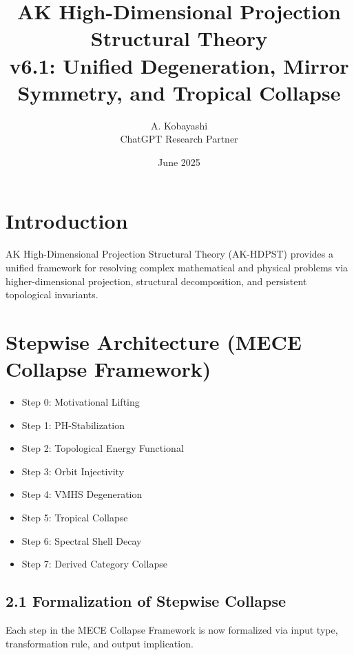 \documentclass[11pt]{article}
\title{AK High-Dimensional Projection Structural Theory\\
\large v6.1: Unified Degeneration, Mirror Symmetry, and Tropical Collapse}
\author{A. Kobayashi \\ ChatGPT Research Partner}
\date{June 2025}
\begin{document}
\maketitle

\tableofcontents
\newpage


\section{Introduction}
AK High-Dimensional Projection Structural Theory (AK-HDPST) provides a unified framework for resolving complex mathematical and physical problems via higher-dimensional projection, structural decomposition, and persistent topological invariants.


\section{Stepwise Architecture (MECE Collapse Framework)}
\begin{itemize}
    \item Step 0: Motivational Lifting
    \item Step 1: PH-Stabilization
    \item Step 2: Topological Energy Functional
    \item Step 3: Orbit Injectivity
    \item Step 4: VMHS Degeneration
    \item Step 5: Tropical Collapse
    \item Step 6: Spectral Shell Decay
    \item Step 7: Derived Category Collapse
\end{itemize}

\subsection*{2.1 Formalization of Stepwise Collapse}

Each step in the MECE Collapse Framework is now formalized via input type, transformation rule, and output implication.
\end{document}
